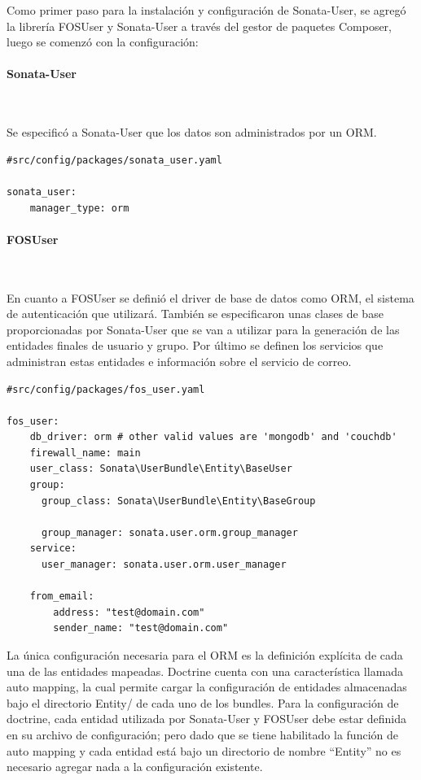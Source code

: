 Como primer paso para la instalación y configuración de Sonata-User, se agregó la librería FOSUser y Sonata-User a través del gestor de paquetes Composer,
luego se comenzó con la configuración:

\paragraph{Sonata-User}~\newline

Se especificó a Sonata-User que los datos son administrados por un ORM.

\begin{lstlisting}[caption=archivo de configuración de sonata-user]
#src/config/packages/sonata_user.yaml

sonata_user:
    manager_type: orm

\end{lstlisting}

\paragraph{FOSUser}~\newline

En cuanto a FOSUser se definió el driver de base de datos como ORM, el sistema de autenticación que utilizará\@. También se especificaron unas clases de base
proporcionadas por Sonata-User que se van a utilizar para la generación de las entidades finales de usuario y grupo\@. Por último se definen los servicios
que administran estas entidades e información sobre el servicio de correo.

\begin{lstlisting}[caption=archivo de configuración de FOSUser]
#src/config/packages/fos_user.yaml

fos_user:
    db_driver: orm # other valid values are 'mongodb' and 'couchdb'
    firewall_name: main
    user_class: Sonata\UserBundle\Entity\BaseUser
    group:
      group_class: Sonata\UserBundle\Entity\BaseGroup

      group_manager: sonata.user.orm.group_manager
    service:
      user_manager: sonata.user.orm.user_manager

    from_email:
        address: "test@domain.com"
        sender_name: "test@domain.com"

\end{lstlisting}



La única configuración necesaria para el ORM es la definición explícita de cada una de las entidades mapeadas.
Doctrine cuenta con una característica llamada auto mapping, la cual permite cargar la configuración de entidades almacenadas bajo el directorio Entity/
de cada uno de los bundles.
Para la configuración de doctrine, cada entidad utilizada por Sonata-User y FOSUser debe estar definida en su archivo de configuración; pero dado que se
tiene habilitado la función de auto mapping y cada entidad está bajo un directorio de nombre “Entity” no es necesario agregar nada a la configuración existente.

